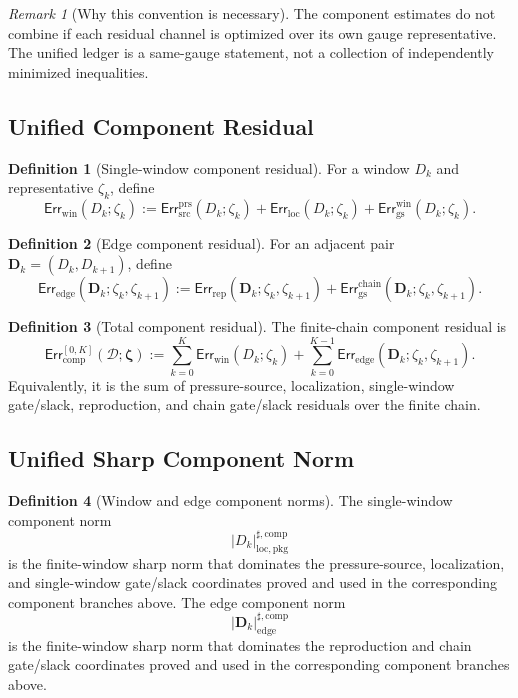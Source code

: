 \documentclass[11pt]{article}
\numberwithin{equation}{section}
\theoremstyle{definition}
\newtheorem{definition}[definition]{Definition}
\theoremstyle{remark}
\newtheorem{remark}[remark]{Remark}
\newcommand{\loc}{\mathrm{loc}}
\newcommand{\pkg}{\mathrm{pkg}}
\newcommand{\prs}{\mathrm{prs}}
\newcommand{\src}{\mathrm{src}}
\newcommand{\rep}{\mathrm{rep}}
\newcommand{\gs}{\mathrm{gs}}
\newcommand{\locerr}{\mathrm{loc}}
\newcommand{\comp}{\mathrm{comp}}
\newcommand{\chain}{\mathrm{chain}}
\newcommand{\Err}{\mathsf{Err}}
\newcommand{\calD}{\mathcal D}
\newcommand{\bfD}{\mathbf D}
\newcommand{\bzeta}{\boldsymbol\zeta}
\begin{document}
\begin{remark}[Why this convention is necessary]
The component estimates do not combine if each residual channel is optimized
over its own gauge representative.  The unified ledger is a same-gauge
statement, not a collection of independently minimized inequalities.
\end{remark}

\subsection{Unified Component Residual}
\label{comp:sec:residual}

\begin{definition}[Single-window component residual]
\label{comp:def:window-residual}
For a window \(D_k\) and representative \(\zeta_k\), define
\[
    \Err_{\mathrm{win}}(D_k;\zeta_k)
    :=
    \Err_{\src}^{\prs}(D_k;\zeta_k)
    +
    \Err_{\locerr}(D_k;\zeta_k)
    +
    \Err_{\gs}^{\mathrm{win}}(D_k;\zeta_k).
\]
\end{definition}

\begin{definition}[Edge component residual]
\label{comp:def:edge-residual}
For an adjacent pair \(\bfD_k=(D_k,D_{k+1})\), define
\[
    \Err_{\mathrm{edge}}(\bfD_k;\zeta_k,\zeta_{k+1})
    :=
    \Err_{\rep}(\bfD_k;\zeta_k,\zeta_{k+1})
    +
    \Err_{\gs}^{\chain}(\bfD_k;\zeta_k,\zeta_{k+1}).
\]
\end{definition}

\begin{definition}[Total component residual]
\label{comp:def:component-residual}
The finite-chain component residual is
\[
    \Err_{\comp}^{[0,K]}(\calD;\bzeta)
    :=
    \sum_{k=0}^{K}
    \Err_{\mathrm{win}}(D_k;\zeta_k)
    +
    \sum_{k=0}^{K-1}
    \Err_{\mathrm{edge}}(\bfD_k;\zeta_k,\zeta_{k+1}).
\]
Equivalently, it is the sum of pressure-source, localization, single-window
gate/slack, reproduction, and chain gate/slack residuals over the finite chain.
\end{definition}

\subsection{Unified Sharp Component Norm}
\label{comp:sec:norm}

\begin{definition}[Window and edge component norms]
\label{comp:def:window-edge-norms}
The single-window component norm
\[
    |D_k|_{\loc,\pkg}^{\sharp,\comp}
\]
is the finite-window sharp norm that dominates the pressure-source,
localization, and single-window gate/slack coordinates proved and used in
the corresponding component branches above.
The edge component norm
\[
    |\bfD_k|_{\mathrm{edge}}^{\sharp,\comp}
\]
is the finite-window sharp norm that dominates the reproduction and chain
gate/slack coordinates proved and used in the corresponding component branches
above.
\end{definition}
\end{document}
